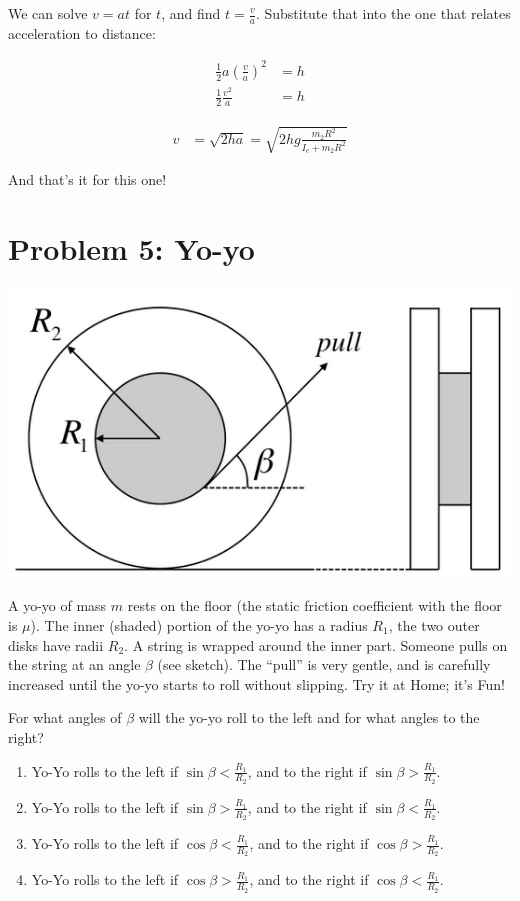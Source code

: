 \documentclass[12pt,a4paper]{report}
\begin{document}
We can solve $v = a t$ for $t$, and find $\displaystyle t = \frac{v}{a}$. Substitute that into the one that relates acceleration to distance:

\begin{align}
\frac{1}{2} a \left(\frac{v}{a}\right)^2 &= h\\
\frac{1}{2} \frac{v^2}{a} &= h
\end{align}

\begin{align}
v &= \sqrt{2 h a} = \sqrt{2 h g \frac{m_2 R^2}{I_c + m_2 R^2}}
\end{align}

And that's it for this one!

\section{Problem 5: Yo-yo}

\begin{center}
\includegraphics[scale=0.45]{Graphics/h7p5}
\end{center}

A yo-yo of mass $m$ rests on the floor (the static friction coefficient with the floor is $\mu$). The inner (shaded) portion of the yo-yo has a radius $R_1$, the two outer disks have radii $R_2$. A string is wrapped around the inner part. Someone pulls on the string at an angle $\beta$ (see sketch). The ``pull'' is very gentle, and is carefully increased until the yo-yo starts to roll without slipping. Try it at Home; it's Fun!

For what angles of $\beta$ will the yo-yo roll to the left and for what angles to the right?

\begin{enumerate}
\item Yo-Yo rolls to the left if $\displaystyle \sin \beta < \frac{R_1}{R_2}$, and to the right if $\displaystyle \sin \beta > \frac{R_1}{R_2}$.
\item Yo-Yo rolls to the left if $\displaystyle \sin \beta > \frac{R_1}{R_2}$, and to the right if $\displaystyle \sin \beta < \frac{R_1}{R_2}$.
\item Yo-Yo rolls to the left if $\displaystyle \cos \beta < \frac{R_1}{R_2}$, and to the right if $\displaystyle \cos \beta > \frac{R_1}{R_2}$.
\item Yo-Yo rolls to the left if $\displaystyle \cos \beta > \frac{R_1}{R_2}$, and to the right if $\displaystyle \cos \beta < \frac{R_1}{R_2}$.
\end{enumerate}
\end{document}
